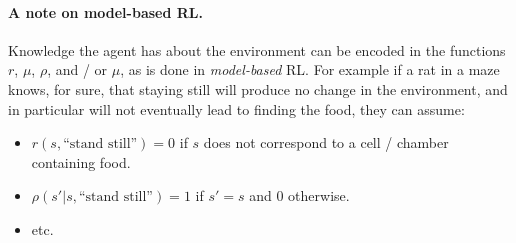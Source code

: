 \documentclass{article} %
\begin{document}
\paragraph{A note on model-based RL.}
Knowledge the agent has about the environment can be encoded in the
functions $r$, $\mu$, $\rho$, and / or $\mu$, as is done in
\textit{model-based} RL. For example if a rat in a maze knows, for sure,
that staying still will produce no change in the environment, and in particular will not eventually lead to finding the food, they can assume:
\begin{itemize}
\item $r(s, \text{``stand still''}) = 0$ if $s$ does not correspond to a cell / chamber containing food.
\item $\rho(s'|s,\text{``stand still''}) = 1$ if $s'=s$ and $0$ otherwise.
\item etc.
\end{itemize}
\end{document}
